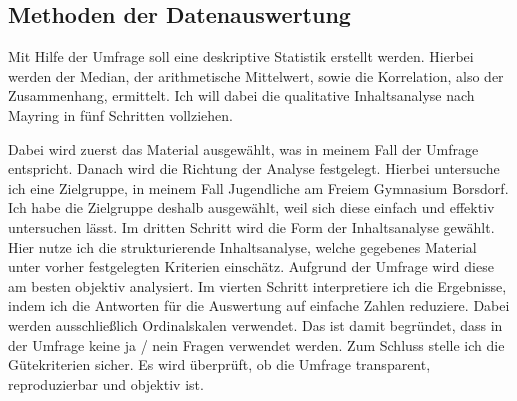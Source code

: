 \subsection{Methoden der Datenauswertung}

Mit Hilfe der Umfrage soll eine deskriptive Statistik\cite{empirisch} erstellt werden. Hierbei werden der Median, der arithmetische Mittelwert, sowie die Korrelation, also der Zusammenhang, ermittelt. Ich will dabei die qualitative Inhaltsanalyse nach Mayring in fünf Schritten vollziehen\cite{Pfeiffer06.Dezember.2021}. 

Dabei wird zuerst das Material ausgewählt, was in meinem Fall der Umfrage entspricht. 
Danach wird die Richtung der Analyse festgelegt. Hierbei untersuche ich eine Zielgruppe, in meinem Fall Jugendliche am Freiem Gymnasium 
Borsdorf. Ich habe die Zielgruppe deshalb ausgewählt, weil sich diese einfach und effektiv untersuchen lässt.
Im dritten Schritt wird die Form der Inhaltsanalyse gewählt. Hier nutze ich die strukturierende Inhaltsanalyse, welche 
gegebenes Material unter vorher festgelegten Kriterien einschätz. Aufgrund der Umfrage wird diese am besten objektiv 
analysiert.
Im vierten Schritt interpretiere ich die Ergebnisse, indem ich die Antworten für die Auswertung auf einfache Zahlen
reduziere. Dabei werden ausschließlich Ordinalskalen \cite{Pfeiffer27.Juni.2018} verwendet. Das ist damit begründet, dass in der 
Umfrage keine ja / nein Fragen verwendet werden.
Zum Schluss stelle ich die Gütekriterien sicher. Es wird überprüft, ob die Umfrage
transparent, reproduzierbar und objektiv ist.